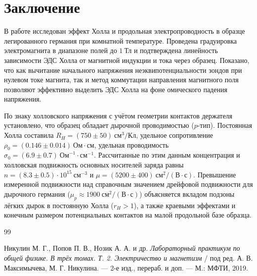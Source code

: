 \documentclass[reprint, amsmath, amssymb, aps, pra, nofootinbib]{revtex4-2}
\begin{document}
\section{Заключение}
В работе исследован эффект Холла и продольная электропроводность в образце легированного германия при комнатной температуре.
Проведена градуировка электромагнита в диапазоне полей до $1~\text{Тл}$ и подтверждена линейность зависимости ЭДС Холла от магнитной индукции и тока через образец.
Показано, что как вычитание начального напряжения неэквипотенциальности зондов при нулевом токе магнита, так и метод коммутации направления магнитного поля позволяют эффективно выделить ЭДС Холла на фоне омического падения напряжения.

По знаку холловского напряжения с учётом геометрии контактов держателя установлено, что образец обладает дырочной проводимостью ($p$-тип).
Постоянная Холла составила $R_H = (750 \pm 50)~\text{см}^3/\text{Кл}$, удельное сопротивление $\rho_0 = (0.146 \pm 0.014)~\text{Ом}\cdot\text{см}$, удельная проводимость $\sigma_0 = (6.9 \pm 0.7)~\text{Ом}^{-1}\cdot\text{см}^{-1}$.
Рассчитанные по этим данным концентрация и холловская подвижность основных носителей заряда равны $n = (8.3 \pm 0.5)\cdot 10^{15}~\text{см}^{-3}$ и $\mu = (5200 \pm 400)~\text{см}^2/(\text{В}\cdot\text{с})$.
Превышение измеренной подвижности над справочным значением дрейфовой подвижности для дырочного германия ($\mu_p \approx 1900~\text{см}^2/(\text{В}\cdot\text{с})$) объясняется вкладом подзоны лёгких дырок в постоянную Холла ($r_H > 1$), а также краевыми эффектами и конечным размером потенциальных контактов на малой продольной базе образца.

\begin{thebibliography}{99}

Никулин М. Г., Попов П. В., Нозик А. А. и др. \textit{Лабораторный практикум по общей физике. В трёх томах. Т. 2. Электричество и магнетизм} / под ред. А. В. Максимычева, М. Г. Никулина. --- 2-е изд., перераб. и доп. --- М.: МФТИ, 2019.

\end{thebibliography}
\end{document}

